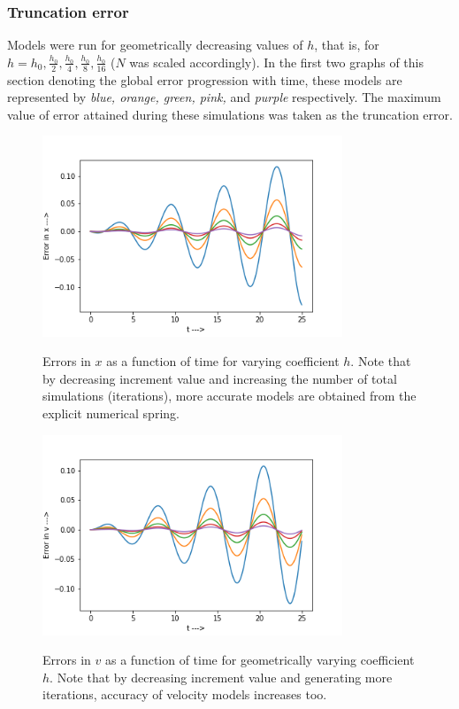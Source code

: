 \documentclass{report}
\begin{document}
\subsubsection*{Truncation error}
Models were run for geometrically decreasing values of $h$, that is, for $h=h_0, \frac{h_0}{2}, \frac{h_0}{4}, \frac{h_0}{8}, \frac{h_0}{16}$ ($N$ was scaled accordingly). In the first two graphs of this section denoting the global error progression with time, these models are represented by \emph{blue, orange, green, pink,} and \emph{purple} respectively. The maximum value of error attained during these simulations was taken as the truncation error.
\begin{figure}[H]
	\centering
	\includegraphics[width = 0.8\textwidth]{eXc.png}
	\label{trXe}
	\caption{Errors in $x$ as a function of time for varying coefficient $h$. Note that by decreasing increment value and increasing the number of total simulations (iterations), more accurate models are obtained from the explicit numerical spring.}
\end{figure}
\begin{figure}[H]
	\centering
	\includegraphics[width = 0.8\textwidth]{eVc.png}
	\label{trVe}
	\caption{Errors in $v$ as a function of time for geometrically varying coefficient $h$. Note that by decreasing increment value and generating more iterations, accuracy of velocity models increases too.}
\end{figure}
\end{document}
